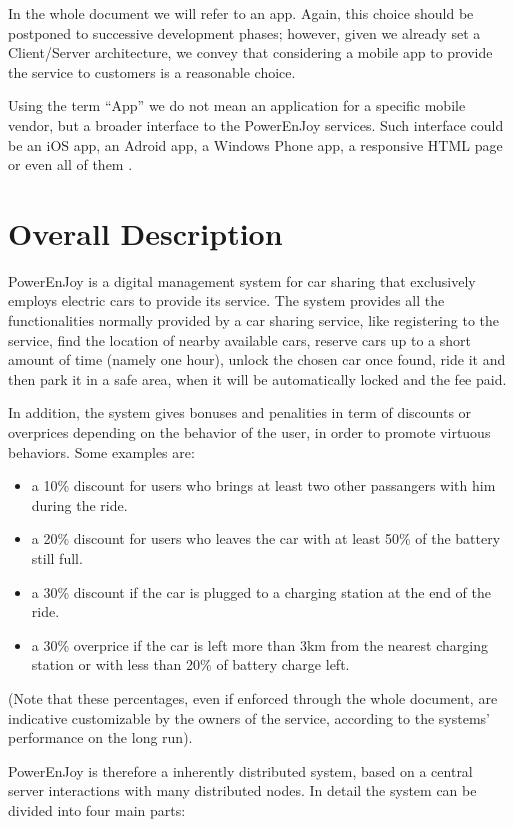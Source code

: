 \documentclass[11pt]{article} %
\newcommand{\pe}{PowerEnJoy }
\begin{document}
In the whole document we will refer to an app. Again, this choice should be postponed to successive development phases; however, given we already set a Client/Server architecture, we convey that considering a mobile app to provide the service to customers is a reasonable choice.

Using the term ``App'' we do not mean an application for a specific mobile vendor, but a broader interface to the \pe services. Such interface could be an iOS app, an Adroid app, a Windows Phone app, a responsive HTML page or even all of them
.

\section{Overall Description}

\pe is a digital management system for car sharing that exclusively employs electric cars to provide its service. The system provides all the functionalities normally provided by a car sharing service, like registering to the service, find the location of nearby available cars, reserve cars up to a short amount of time (namely one hour), unlock the chosen car once found, ride it and then park it in a safe area, when it will be automatically locked and the fee paid.

In addition, the system gives bonuses and penalities in term of discounts or overprices depending on the behavior of the user, in order to promote virtuous behaviors. Some examples are:

\begin{itemize}
	\item a 10\% discount for users who brings at least two other
 passangers with him during the ride.
	\item a 20\% discount for users who leaves the car with at least 50\% of the battery still full.
	\item a 30\% discount if the car is plugged to a charging station at the end of the ride.
	\item a 30\% overprice if the car is left more than 3km from the nearest charging station or with less than 20\% of battery charge left.
\end{itemize}
(Note that these percentages, even if enforced through the whole document, are indicative customizable by the owners of the service, according to the systems' performance on the long run).

\pe is therefore a inherently distributed system, based on a central server interactions with many distributed nodes. In detail the system can be divided into four main parts: 
\end{document}
